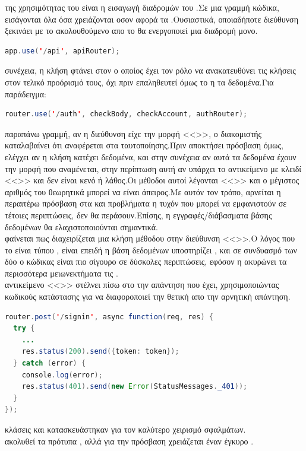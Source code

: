  της χρησιμότητας του  είναι η εισαγωγή διαδρομών του .Σε μια γραμμή κώδικα, εισάγονται όλα όσα χρειάζονται οσον αφορά τα .Ουσιαστικά, οποιαδήποτε διεύθυνση ξεκινάει με το  ακολουθούμενο απο το  θα ενεργοποιεί μια διαδρομή μονο.\\
	\begin{lstlisting}[language=Java]
	app.use('/api', apiRouter);
	\end{lstlisting}
 συνέχεια, η κλήση φτάνει στον  ο οποίος έχει τον ρόλο να ανακατευθύνει τις κλήσεις στον τελικό προόρισμό τους, όχι πριν επαληθευτεί όμως το  η τα δεδομένα.Για παράδειγμα:\\
	\begin{lstlisting}[language=Java]
router.use('/auth', checkBody, checkAccount, authRouter);
	\end{lstlisting}
 παραπάνω γραμμή, αν η διεύθυνση είχε την μορφή <<>>, ο διακομιστής καταλαβαίνει ότι αναφέρεται στα  ταυτοποίησης.Πριν αποκτήσει πρόσβαση όμως, ελέγχει αν η κλήση  κατέχει δεδομένα, και στην συνέχεια αν αυτά τα δεδομένα έχουν την μορφή που αναμένεται, στην περίπτωση αυτή αν υπάρχει το αντικείμενο με κλειδί <<>> και δεν είναι κενό ή λάθος.Οι μέθοδοι αυτοί λέγονται <<>> και ο μέγιστος αριθμός του θεωρητικά μπορεί να είναι άπειρος.Με αυτόν τον τρόπο, αρνείται η περαιτέρω πρόσβαση στα  και προβλήματα η τυχόν  που μπορεί να εμφανιστούν σε τέτοιες περιπτώσεις, δεν θα περάσουν.Επίσης, η εγγραφές/διάβασματα βάσης δεδομένων θα ελαχιστοποιούνται σημαντικά.\\
 φαίνεται πως διαχειρίζεται μια κλήση μέθοδου  στην διεύθυνση <<>>.Ο λόγος που το  είναι τύπου , είναι επειδή η βάση δεδομένων υποστηρίζει , και σε συνδυασμό των δύο ο κώδικας είναι πιο σίγουρο σε δύσκολες περιπτώσεις, εφόσον η  ακυρώνει τα περισσότερα μειωνεκτήματα τις .\\
 αντικείμενο <<>> στέλνει πίσω στο  την απάντηση που έχει, χρησιμοποιώντας κωδικούς κατάστασης για να διαφοροποιεί την θετική απο την αρνητική απάντηση.
	\begin{lstlisting}[language=Java]
router.post('/signin', async function(req, res) {
  try {
    ...
    res.status(200).send({token: token});
  } catch (error) {
    console.log(error);
    res.status(401).send(new Error(StatusMessages._401));
  }
});
	\end{lstlisting}
 κλάσεις  και  κατασκευάστηκαν για τον καλύτερο χειρισμό σφαλμάτων.\\
  ακολυθεί τα πρότυπα , αλλά για την πρόσβαση χρειάζεται έναν έγκυρο .

